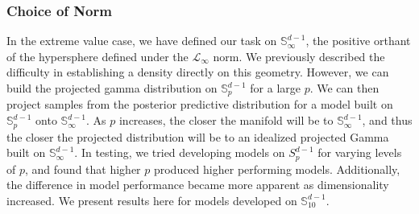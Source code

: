
\subsubsection{Choice of Norm\label{subsubsec:norm}}
In the extreme value case, we have defined our task on ${\mathbb S}_{\infty}^{d-1}$, the positive orthant
  of the hypersphere defined under the $\mathcal{L}_{\infty}$ norm.  We previously described the
  difficulty in establishing a density directly on this geometry.  However, we can build the projected
  gamma distribution on ${\mathbb S}_p^{d-1}$ for a large $p$.  We can then project samples from the
  posterior predictive distribution for a model built on ${\mathbb S}_p^{d-1}$ onto
  ${\mathbb S}_{\infty}^{d-1}$. As $p$ increases, the closer the manifold will be to
  ${\mathbb S}_{\infty}^{d-1}$, and thus the closer the projected distribution will be to an idealized
  projected Gamma built on ${\mathbb S}_{\infty}^{d-1}$.  In testing, we tried developing models on
  $S_p^{d-1}$ for varying levels of $p$, and found that higher $p$ produced higher performing models.
  Additionally, the difference in model performance became more apparent as dimensionality increased.
  We present results here for models developed on ${\mathbb S}_{10}^{d-1}$.

